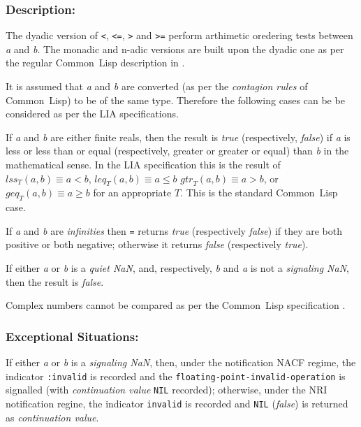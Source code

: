 \documentclass[10pt,fleqn]{article}
\newcommand{\CL}{\textsf{Common~Lisp}}
\newcommand{\code}[1]{\texttt{#1}}
\newcommand{\clieeeterm}[1]{\textit{#1}}
\newcommand{\varname}[1]{\textit{#1}}
\newcommand{\DDescription}{\subsubsection*{Description:}}
\newcommand{\DExceptional}{\subsubsection*{Exceptional Situations:}}
\begin{document}
\DDescription{}

The dyadic version of \code{<}, \code{<=}, \code{>} and \code{>=}
perform arthimetic oredering tests between \varname{a} and
\varname{b}.  The monadic and n-adic versions are built upon the
dyadic one as per the regular \CL{} description in
\cite{1996:ANSIHyperSpec}.

It is assumed that \varname{a} and \varname{b} are converted (as per
the \emph{contagion rules} of \CL{}) to be of the same type.
Therefore the following cases can be be considered as per the LIA
specifications.

\begin{description}
\item If \varname{a} and \varname{b} are either finite reals, then the result is
\varname{true} (respectively, \varname{false}) if \varname{a} is
less or less than or equal (respectively, greater or greater or equal)
than \varname{b} in the mathematical sense.  In the
LIA specification this is the result of
$\mathit{lss}_T(a, b) \equiv a < b$,
$\mathit{leq}_T(a, b) \equiv a \leq b$
$\mathit{gtr}_T(a, b) \equiv a > b$, or
$\mathit{geq}_T(a, b) \equiv a \geq b$
for an
appropriate $T$.  This is the standard \CL{} case.

\item If \varname {a} and \varname {b} are \clieeeterm{infinities} then
\code{=} returns \varname{true} (respectively \varname{false}) if they
are both positive or both negative; otherwise it returns
\varname{false} (respectively \varname{true}).

\item If either \varname {a} or \varname {b} is a \clieeeterm{quiet NaN},
and, respectively, \varname {b} and \varname {a} is not a
\clieeeterm{signaling NaN}, then the result is \varname{false}.

\item Complex numbers cannot be compared as per the \CL{}
  specification \cite{1996:ANSIHyperSpec}.
\end{description}

\DExceptional{}

If either \varname {a} or \varname {b} is a \clieeeterm{signaling
  NaN}, then, under the notification NACF regime, the indicator
\code{:invalid} is recorded and the
\code{floating-point-invalid-operation} is signalled (with
\emph{continuation value} \code{NIL} recorded); otherwise, under the
NRI notification regine, the indicator \code{invalid} is recorded and
\code{NIL} (\varname{false}) is returned as \emph{continuation value}.
\end{document}

